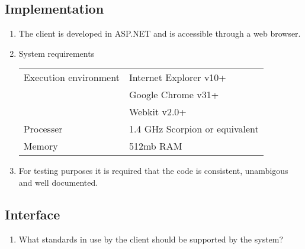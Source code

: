 \documentclass[../report.tex]{subfiles}
\begin{document}
\subsection{Implementation}
\begin{enumerate}[label=Im\arabic*:]
\item The client is developed in ASP.NET and is accessible through a web browser.
\item System requirements


\begin{tabular}{| l | l | }
\hline
 Execution environment & Internet Explorer v10+\\
& Google Chrome v31+\\
& Webkit v2.0+\\ \hline
 Processer & 1.4 GHz Scorpion or equivalent \\ \hline
 Memory & 512mb RAM  \\ \hline

\end{tabular}

\item For testing purposes it is required that the code is consistent, unambigous and well documented.
\end{enumerate}

\subsection{Interface}

\begin{enumerate}[label=In\arabic*:]
\item {\color{red}What standards in use by the client should be supported by the system?}
\end{enumerate}
\end{document}
